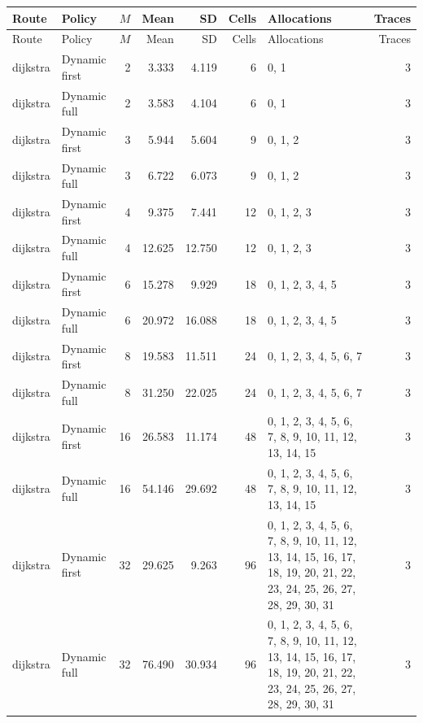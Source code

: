 \documentclass[10pt,a4paper]{article}
\begin{document}
\tiny\setlength{\tabcolsep}{2pt}\begin{longtable}{@{}p{23mm}p{29mm}rrrrp{36mm}r@{}}
\toprule Route & Policy & $M$ & Mean & SD & Cells & Allocations & Traces \\ \midrule\endfirsthead
\toprule Route & Policy & $M$ & Mean & SD & Cells & Allocations & Traces \\ \midrule\endhead
\bottomrule\endfoot
dijkstra & Dynamic first & 2 & 3.333 & 4.119 & 6 & 0, 1 & 3 \\
dijkstra & Dynamic full & 2 & 3.583 & 4.104 & 6 & 0, 1 & 3 \\
dijkstra & Dynamic first & 3 & 5.944 & 5.604 & 9 & 0, 1, 2 & 3 \\
dijkstra & Dynamic full & 3 & 6.722 & 6.073 & 9 & 0, 1, 2 & 3 \\
dijkstra & Dynamic first & 4 & 9.375 & 7.441 & 12 & 0, 1, 2, 3 & 3 \\
dijkstra & Dynamic full & 4 & 12.625 & 12.750 & 12 & 0, 1, 2, 3 & 3 \\
dijkstra & Dynamic first & 6 & 15.278 & 9.929 & 18 & 0, 1, 2, 3, 4, 5 & 3 \\
dijkstra & Dynamic full & 6 & 20.972 & 16.088 & 18 & 0, 1, 2, 3, 4, 5 & 3 \\
dijkstra & Dynamic first & 8 & 19.583 & 11.511 & 24 & 0, 1, 2, 3, 4, 5, 6, 7 & 3 \\
dijkstra & Dynamic full & 8 & 31.250 & 22.025 & 24 & 0, 1, 2, 3, 4, 5, 6, 7 & 3 \\
dijkstra & Dynamic first & 16 & 26.583 & 11.174 & 48 & 0, 1, 2, 3, 4, 5, 6, 7, 8, 9, 10, 11, 12, 13, 14, 15 & 3 \\
dijkstra & Dynamic full & 16 & 54.146 & 29.692 & 48 & 0, 1, 2, 3, 4, 5, 6, 7, 8, 9, 10, 11, 12, 13, 14, 15 & 3 \\
dijkstra & Dynamic first & 32 & 29.625 & 9.263 & 96 & 0, 1, 2, 3, 4, 5, 6, 7, 8, 9, 10, 11, 12, 13, 14, 15, 16, 17, 18, 19, 20, 21, 22, 23, 24, 25, 26, 27, 28, 29, 30, 31 & 3 \\
dijkstra & Dynamic full & 32 & 76.490 & 30.934 & 96 & 0, 1, 2, 3, 4, 5, 6, 7, 8, 9, 10, 11, 12, 13, 14, 15, 16, 17, 18, 19, 20, 21, 22, 23, 24, 25, 26, 27, 28, 29, 30, 31 & 3 \\
\end{longtable}\normalsize\setlength{\tabcolsep}{6pt}
\clearpage
\end{document}
